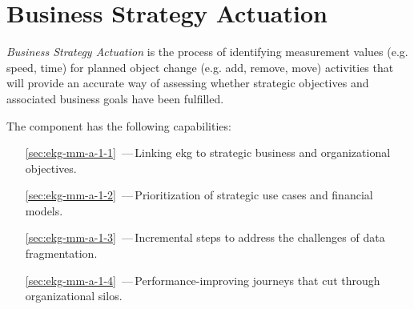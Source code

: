 \chapter{Business Strategy Actuation}\label{ch:ekg-mm-a-1}\label{ch:ekg-mm-business-strategy-actuation} %

\textit{Business Strategy Actuation} is the process of identifying measurement values (e.g. speed, time)
for planned object change (e.g. add, remove, move) activities that will provide an accurate way of
assessing whether strategic objectives and associated business goals have been fulfilled.

The  component has the following capabilities:

\begin{itemize}[leftmargin=.5in]
  \item [\ref{sec:ekg-mm-a-1-1}] \,---\,Linking \gls{ekg} to strategic business and organizational objectives.
  \item [\ref{sec:ekg-mm-a-1-2}] \,---\,Prioritization of strategic use cases and financial models.
  \item [\ref{sec:ekg-mm-a-1-3}] \,---\,Incremental steps to address the challenges of data fragmentation.
  \item [\ref{sec:ekg-mm-a-1-4}] \,---\,Performance-improving journeys that cut through organizational silos.
\end{itemize}





